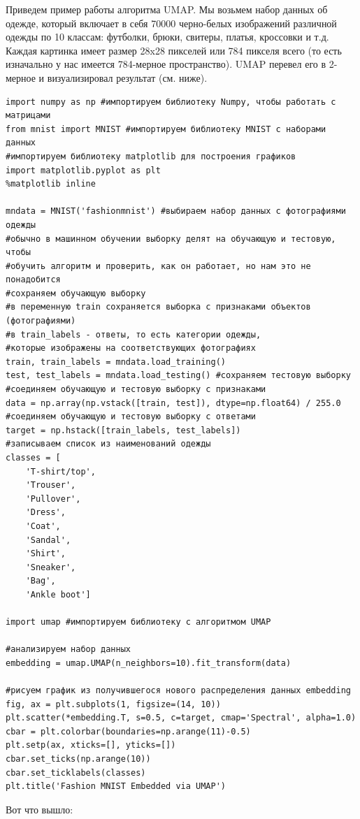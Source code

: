 \begin{itemize}
	Приведем пример работы алгоритма UMAP. Мы возьмем набор данных об одежде, который включает в себя 70000 черно-белых изображений различной одежды по 10 классам: футболки, брюки, свитеры, платья, кроссовки и т.д. Каждая картинка имеет размер 28x28 пикселей или 784 пикселя всего (то есть изначально у нас имеется 784-мерное пространство). UMAP перевел его в 2-мерное и визуализировал результат (см. ниже).
	
	\begin{verbatim}
import numpy as np #импортируем библиотеку Numpy, чтобы работать с матрицами
from mnist import MNIST #импортируем библиотеку MNIST с наборами данных
#импортируем библиотеку matplotlib для построения графиков
import matplotlib.pyplot as plt
%matplotlib inline
		
mndata = MNIST('fashionmnist') #выбираем набор данных с фотографиями одежды
#обычно в машинном обучении выборку делят на обучающую и тестовую, чтобы
#обучить алгоритм и проверить, как он работает, но нам это не понадобится
#сохраняем обучающую выборку
#в переменную train сохраняется выборка с признаками объектов (фотографиями)
#в train_labels - ответы, то есть категории одежды,
#которые изображены на соответствующих фотографиях
train, train_labels = mndata.load_training() 
test, test_labels = mndata.load_testing() #сохраняем тестовую выборку
#соединяем обучающую и тестовую выборку с признаками
data = np.array(np.vstack([train, test]), dtype=np.float64) / 255.0
#соединяем обучающую и тестовую выборку с ответами
target = np.hstack([train_labels, test_labels])
#записываем список из наименований одежды
classes = [
	'T-shirt/top',
	'Trouser',
	'Pullover',
	'Dress',
	'Coat',
	'Sandal',
	'Shirt',
	'Sneaker',
	'Bag',
	'Ankle boot']
			
import umap #импортируем библиотеку с алгоритмом UMAP

#анализируем набор данных
embedding = umap.UMAP(n_neighbors=10).fit_transform(data)
		
#рисуем график из получившегося нового распределения данных embedding
fig, ax = plt.subplots(1, figsize=(14, 10))
plt.scatter(*embedding.T, s=0.5, c=target, cmap='Spectral', alpha=1.0)
cbar = plt.colorbar(boundaries=np.arange(11)-0.5)
plt.setp(ax, xticks=[], yticks=[])
cbar.set_ticks(np.arange(10))
cbar.set_ticklabels(classes)
plt.title('Fashion MNIST Embedded via UMAP')
	\end{verbatim}

Вот что вышло:


\end{itemize}
